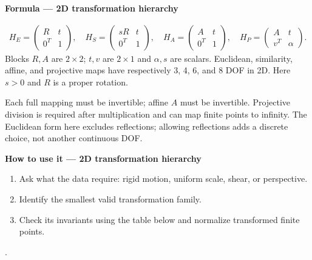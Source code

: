 \documentclass[letterpaper,11pt,english,openany,oneside]{jupyterBook}
\begin{document}
\begin{TextbookBox}
\textbf{Formula — 2D transformation hierarchy}\par\smallskip
\begin{equation}\label{equation:lectures/lecture01/transformations:eq-lec01-hierarchy}
\begin{split}H_E=\begin{pmatrix}R&t\\0^T&1\end{pmatrix},\quad
H_S=\begin{pmatrix}sR&t\\0^T&1\end{pmatrix},\quad
H_A=\begin{pmatrix}A&t\\0^T&1\end{pmatrix},\quad
H_P=\begin{pmatrix}A&t\\v^T&\alpha\end{pmatrix}.\end{split}
\end{equation}
\sphinxAtStartPar
Blocks \(R,A\) are \(2\times2\); \(t,v\) are \(2\times1\) and \(\alpha,s\) are scalars. Euclidean, similarity, affine, and projective maps have respectively 3, 4, 6, and 8 DOF in 2D. Here \(s>0\) and \(R\) is a proper rotation.

\sphinxAtStartPar
{} Each full mapping must be invertible; affine \(A\) must be invertible. Projective division is required after multiplication and can map finite points to infinity. The Euclidean form here excludes reflections; allowing reflections adds a discrete choice, not another continuous DOF.

\end{TextbookBox}

\begin{TextbookBox}
\textbf{How to use it — 2D transformation hierarchy}\par\smallskip
\begin{enumerate}
%
\item {}
\sphinxAtStartPar
Ask what the data require: rigid motion, uniform scale, shear, or perspective.

\item {}
\sphinxAtStartPar
Identify the smallest valid transformation family.

\item {}
\sphinxAtStartPar
Check its invariants using the table below and normalize transformed finite points.

\end{enumerate}

\sphinxAtStartPar
{} {\hyperref[\detokenize{lectures/lecture01/transformations:ex-lec01-family}]{}}.

\end{TextbookBox}
\end{document}
